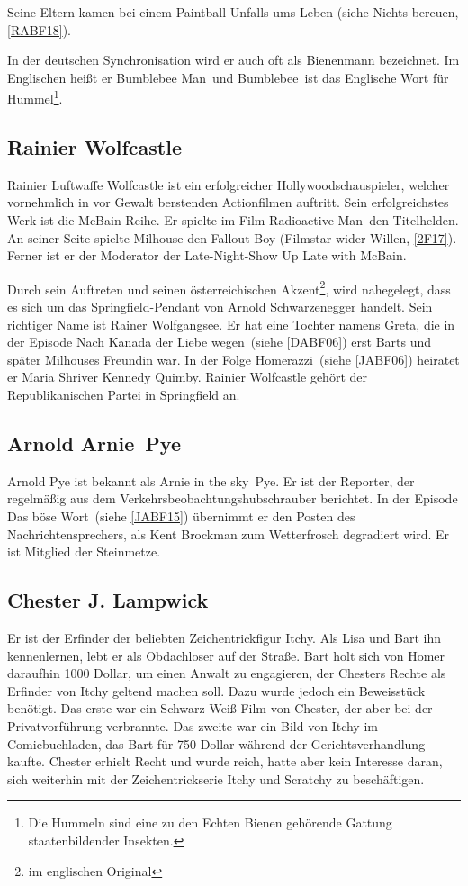 Seine Eltern kamen bei einem Paintball-Unfalls ums Leben (siehe \glqq Nichts bereuen\grqq , \ref{RABF18}).

In der deutschen Synchronisation wird er auch oft als Bienenmann bezeichnet. Im Englischen heißt er \glqq Bumblebee Man\grqq\ und \glqq Bumblebee\grqq\ ist das Englische Wort für Hummel\footnote{Die Hummeln sind eine zu den Echten Bienen gehörende Gattung staatenbildender Insekten.}.

\subsection{Rainier Wolfcastle}\label{RainierWolfcastle}
Rainier Luftwaffe Wolfcastle ist ein erfolgreicher Hollywoodschauspieler, welcher vornehmlich in vor Gewalt berstenden Actionfilmen auftritt. Sein erfolgreichstes Werk ist die McBain-Reihe. Er spielte im Film \glqq Radioactive Man\grqq\ den Titelhelden. An seiner Seite spielte Milhouse den Fallout Boy (\glqq Filmstar wider Willen\grqq , \ref{2F17}). Ferner ist er der Moderator der Late-Night-Show \glqq Up Late with McBain\grqq .

Durch sein Auftreten und seinen österreichischen Akzent\footnote{im englischen Original}, wird nahegelegt, dass es sich um das Springfield-Pendant von Arnold Schwarzenegger handelt. Sein richtiger Name ist Rainer Wolfgangsee. Er hat eine Tochter namens Greta, die in der Episode \glqq Nach Kanada der Liebe wegen\grqq\ (siehe \ref{DABF06}) erst Barts und später Milhouses Freundin war. In der Folge \glqq Homerazzi\grqq\ (siehe \ref{JABF06}) heiratet er Maria Shriver Kennedy Quimby. Rainier Wolfcastle gehört der Republikanischen Partei in Springfield an.


\subsection{Arnold \glqq Arnie\grqq\ Pye}\label{ArniePye}
Arnold Pye ist bekannt als Arnie \glqq in the sky\grqq\ Pye. Er ist der Reporter, der regelmäßig aus dem Verkehrsbeobachtungshubschrauber berichtet. In der Episode \glqq Das böse Wort\grqq\ (siehe \ref{JABF15}) übernimmt er den Posten des Nachrichtensprechers, als Kent Brockman zum Wetterfrosch degradiert wird. Er ist Mitglied der Steinmetze.


\subsection{Chester J. Lampwick}
Er ist der Erfinder der beliebten Zeichentrickfigur Itchy. Als Lisa und Bart ihn kennenlernen, lebt er als Obdachloser auf der Straße. Bart holt sich von Homer daraufhin 1000 Dollar, um einen Anwalt zu engagieren, der Chesters Rechte als Erfinder von Itchy geltend machen soll. Dazu wurde jedoch ein Beweisstück benötigt. Das erste war ein Schwarz-Weiß-Film von Chester, der aber bei der Privatvorführung verbrannte. Das zweite war ein Bild von Itchy im Comicbuchladen, das Bart für 750 Dollar während der Gerichtsverhandlung kaufte. Chester erhielt Recht und wurde reich, hatte aber kein Interesse daran, sich weiterhin mit der Zeichentrickserie Itchy und Scratchy zu beschäftigen.

